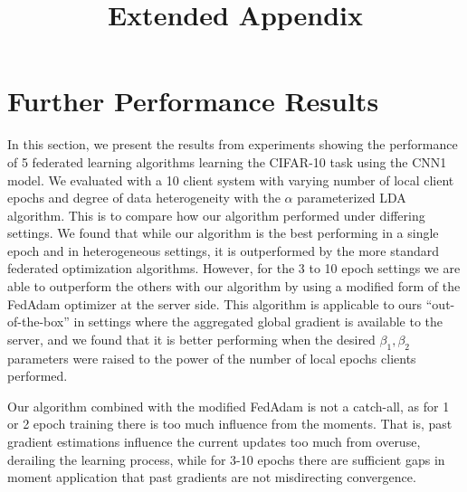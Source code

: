 \documentclass[conference,compsoc]{IEEEtran}
\title{Extended Appendix}
\begin{document}
\maketitle

\section{Further Performance Results}

In this section, we present the results from experiments showing the performance of 5 federated learning algorithms learning the CIFAR-10 task using the CNN1 model. We evaluated with a 10 client system with varying number of local client epochs and degree of data heterogeneity with the $\alpha$ parameterized LDA algorithm. This is to compare how our algorithm performed under differing settings. We found that while our algorithm is the best performing in a single epoch and in heterogeneous settings, it is outperformed by the more standard federated optimization algorithms. However, for the 3 to 10 epoch settings we are able to outperform the others with our algorithm by using a modified form of the FedAdam optimizer at the server side. This algorithm is applicable to ours ``out-of-the-box'' in settings where the aggregated global gradient is available to the server, and we found that it is better performing when the desired $\beta_1, \beta_2$ parameters were raised to the power of the number of local epochs clients performed.

\noindent Our algorithm combined with the modified FedAdam is not a catch-all, as for 1 or 2 epoch training there is too much influence from the moments. That is, past gradient estimations influence the current updates too much from overuse, derailing the learning process, while for 3-10 epochs there are sufficient gaps in moment application that past gradients are not misdirecting convergence.
\end{document}
